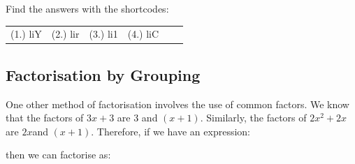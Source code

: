     \label{m39394*cid6}
\par {} Find the answers with the shortcodes:
 \par \begin{tabular}[h]{cccccc}
 (1.) liY  &  (2.) lir  &  (3.) li1  &  (4.) liC  & \end{tabular}
            \subsection{ Factorisation by Grouping}
            \nopagebreak
      \label{m39394*id278358}One other method of factorisation involves the use of common factors. We know that the factors of $3x+3$\hspace{1ex} are 3 and $\left(x+1\right)$. Similarly, the factors of $2{x}^{2}+2x$\hspace{1ex}are $2x$\hspace{1ex}and $\left(x+1\right)$. Therefore, if we have an expression:\par 
      \label{m39394*id278452}\nopagebreak\noindent{}
      \label{m39394*id278488}then we can factorise as:\par 
